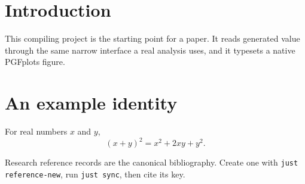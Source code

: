 \section{Introduction}\label{sec:introduction}

This compiling project is the starting point for a paper. It reads
 generated value through the same narrow interface a
real analysis uses, and it typesets a native PGFplots figure.

\section{An example identity}

For real numbers $x$ and $y$,
\begin{equation}
  {(x+y)}^2 = x^2 + 2xy + y^2.
\end{equation}

\begin{center}
\end{center}

Research reference records are the canonical bibliography. Create one with
\texttt{just reference-new}, run \texttt{just sync}, then cite its key.
